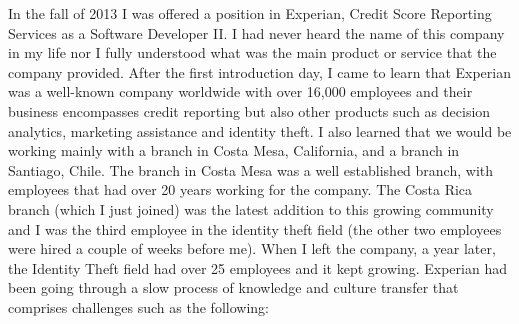 \documentclass[12pt, letterpaper]{article}
\begin{document}
In the fall of 2013 I was offered a position in Experian, Credit Score Reporting Services as a Software Developer II.
I had never heard the name of this company in my life nor I fully understood what was the main product or service that 
the company provided. 
After the first introduction day, I came to learn that Experian was a well-known company worldwide with over 16,000
employees and their business encompasses credit reporting but also other products such as decision 
analytics, marketing assistance and identity theft. I also learned that we would be working mainly with a branch in 
Costa Mesa, California, and a branch in Santiago, Chile. The branch in Costa Mesa was a well established branch, with 
employees that had over 20 years working for the company. The Costa Rica branch (which I just joined) was the 
latest addition to this growing 
community and I was the third employee in the identity theft field (the other two employees were hired a couple of 
weeks before me). When I left the company, a year later, the Identity Theft field had  over 25 employees and it 
kept growing. Experian had been going through a slow process of knowledge and culture transfer that comprises 
challenges such as the following:
\end{document}

